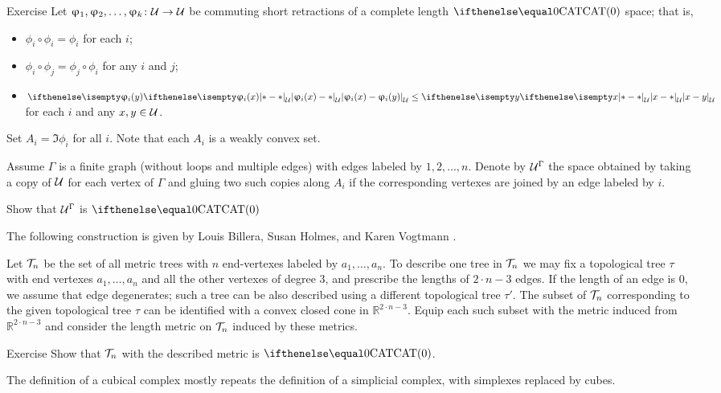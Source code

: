 \begin{thm}{Exercise}\label{ex:short+commuting}
Let $\phi_1,\phi_2,\dots,\phi_k\:\spc{U}\to \spc{U}$ be commuting short retractions of
a complete length $\CAT0$ space; 
that is, 
\begin{itemize}
\item $\phi_i\circ\phi_i=\phi_i$ for each $i$;
\item $\phi_i\circ\phi_j=\phi_j\circ\phi_i$ for any $i$ and $j$;
\item $\dist{\phi_i(x)}{\phi_i(y)}{\spc{U}}\le \dist{x}{y}{\spc{U}}$ for each $i$ and any $x,y\in\spc{U}$.
\end{itemize}
Set $A_i=\Im \phi_i$ for all $i$.
Note that each $A_i$ is a weakly convex set.

Assume $\Gamma$ is a finite graph 
(without loops and multiple edges) 
with edges labeled by $1,2,\dots, n$.
Denote by $\mathcal{U}^\Gamma$ the space obtained by taking 
a copy of $\mathcal{U}$ for each vertex of $\Gamma$ and 
gluing two such copies along $A_i$ if the corresponding vertexes are joined by an edge labeled by $i$.

Show that $\mathcal{U}^\Gamma$ is $\CAT0$
\end{thm}

The following construction is given by 
Louis Billera,
Susan Holmes,
and  Karen Vogtmann \cite{billera-holmes-vogtmann}.

Let $\mathcal{T}_n$ be the set of all metric trees with $n$ end-vertexes
labeled by $a_1,\dots,a_n$.
To describe one tree in $\mathcal{T}_n$ we may fix a topological tree $\tau$ with end vertexes $a_1,\dots,a_n$ and all the other vertexes of degree 3,  
and prescribe the lengths of $2\cdot n-3$ edges.
If the length of an edge is $0$, we assume that edge degenerates;
such a tree can be also described using a different topological tree $\tau'$.
The subset of $\mathcal{T}_n$ corresponding to the given topological tree $\tau$ can be identified with a convex closed cone in  $\mathbb{R}^{2\cdot n-3}$.
Equip each such subset with the metric induced from $\mathbb{R}^{2\cdot n-3}$ and consider the length metric on $\mathcal{T}_n$ induced by these metrics.

\begin{thm}{Exercise}\label{ex:space-of-trees}
Show that $\mathcal{T}_n$ with the described metric is $\CAT0$.
\end{thm}



The definition of a cubical complex
mostly repeats the definition of a simplicial complex, 
with simplexes replaced by cubes.

